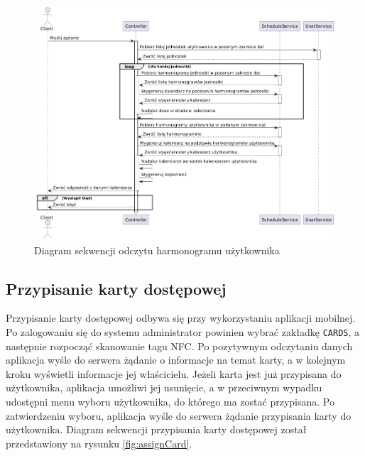 \begin{figure}[H]
    \centering
    \includegraphics[width=\textwidth]{graf/schSeq.png}
    \caption{Diagram sekwencji odczytu harmonogramu użytkownika}
    \label{fig:scheduleSequence}
\end{figure}

\subsection{Przypisanie  karty dostępowej}

Przypisanie karty dostępowej odbywa się przy wykorzystaniu aplikacji mobilnej. Po zalogowaniu się do systemu administrator powinien wybrać zakładkę \texttt{CARDS}, a następnie rozpocząć skanowanie tagu NFC. Po pozytywnym odczytaniu danych aplikacja wyśle do serwera żądanie o informacje na temat karty, a w kolejnym kroku wyświetli informacje jej właścicielu. Jeżeli karta jest już przypisana do użytkownika, aplikacja umożliwi jej usunięcie, a w przeciwnym wypadku udostępni menu wyboru użytkownika, do którego ma zostać przypisana. Po zatwierdzeniu wyboru, aplikacja wyśle do serwera żądanie przypisania karty do użytkownika. Diagram sekwencji przypisania karty dostępowej został przedstawiony na rysunku \ref{fig:assignCard}.

